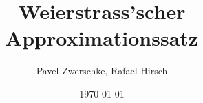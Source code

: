 \documentclass{beamer}
\title[Weierstrass Approximationssatz]{Weierstrass'scher Approximationssatz}
\author{Pavel Zwerschke, Rafael Hirsch}
\date{\today}
\begin{document}
\begin{frame}
    \maketitle
\end{frame}
\end{document}
